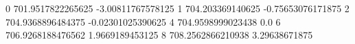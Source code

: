 0 701.9517822265625 -3.00811767578125
1 704.203369140625 -0.75653076171875
2 704.9368896484375 -0.02301025390625
4 704.9598999023438 0.0
6 706.9268188476562 1.9669189453125
8 708.2562866210938 3.29638671875
